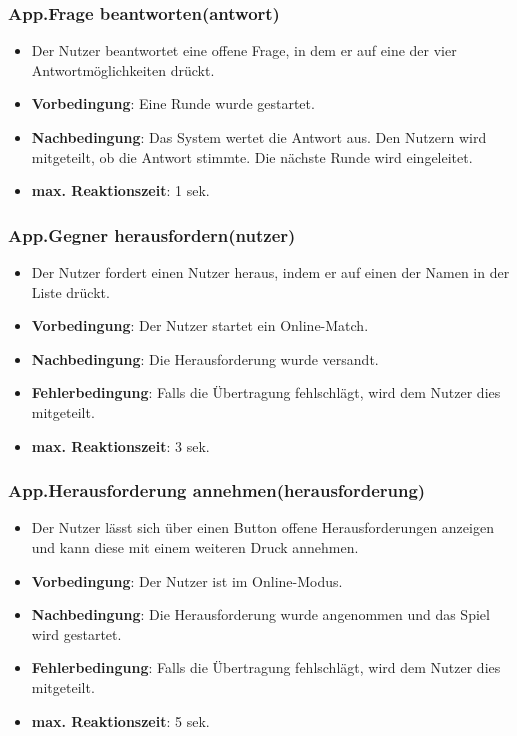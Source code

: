 \documentclass[fontsize=12pt,paper=a4,twoside]{scrartcl}
\begin{document}
\subsubsection{App.Frage beantworten(antwort)}
\begin{itemize}
\item Der Nutzer beantwortet eine offene Frage, in dem er auf eine der vier Antwortmöglichkeiten drückt.
\item \textbf{Vorbedingung}: Eine Runde wurde gestartet.
\item \textbf{Nachbedingung}: Das System wertet die Antwort aus. Den Nutzern wird mitgeteilt, ob die Antwort stimmte. Die nächste Runde wird eingeleitet.
\item \textbf{max. Reaktionszeit}: 1 sek.
\end{itemize}

\subsubsection{App.Gegner herausfordern(nutzer)}
\begin{itemize}
\item Der Nutzer fordert einen Nutzer heraus, indem er auf einen der Namen in der Liste drückt. 
\item \textbf{Vorbedingung}: Der Nutzer startet ein Online-Match.
\item \textbf{Nachbedingung}: Die Herausforderung wurde versandt.
\item \textbf{Fehlerbedingung}: Falls die Übertragung fehlschlägt, wird dem Nutzer dies mitgeteilt.
\item \textbf{max. Reaktionszeit}: 3 sek.
\end{itemize}

\subsubsection{App.Herausforderung annehmen(herausforderung)}
\begin{itemize}
\item Der Nutzer lässt sich über einen Button offene Herausforderungen anzeigen und kann diese mit einem weiteren Druck annehmen. 
\item \textbf{Vorbedingung}: Der Nutzer ist im Online-Modus.
\item \textbf{Nachbedingung}: Die Herausforderung wurde angenommen und das Spiel wird gestartet.
\item \textbf{Fehlerbedingung}: Falls die Übertragung fehlschlägt, wird dem Nutzer dies mitgeteilt.
\item \textbf{max. Reaktionszeit}: 5 sek.
\end{itemize}
\end{document}
